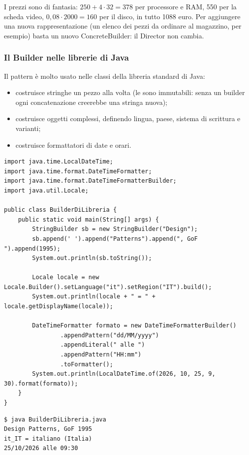 \medskip
I prezzi sono di fantasia: $250 + 4 \cdot 32 = 378$ per processore e RAM, 550 per la scheda video,
$0{,}08 \cdot 2000 = 160$ per il disco, in tutto 1088 euro. Per aggiungere una nuova rappresentazione (un elenco dei pezzi
da ordinare al magazzino, per esempio) basta un nuovo ConcreteBuilder: il Director non cambia.

\subsubsection*{Il Builder nelle librerie di Java}

Il pattern è molto usato nelle classi della libreria standard di Java:
\begin{itemize}
  \item {} costruisce stringhe un pezzo alla volta (le  sono immutabili: senza un
        builder ogni concatenazione creerebbe una stringa nuova);
  \item {} costruisce oggetti  complessi, definendo lingua, paese, sistema di
        scrittura e varianti;
  \item {} costruisce formattatori di date e orari.
\end{itemize}

\begin{lstlisting}[style=java, name=BuilderDiLibreria.java]
import java.time.LocalDateTime;
import java.time.format.DateTimeFormatter;
import java.time.format.DateTimeFormatterBuilder;
import java.util.Locale;

public class BuilderDiLibreria {
    public static void main(String[] args) {
        StringBuilder sb = new StringBuilder("Design");
        sb.append(' ').append("Patterns").append(", GoF ").append(1995);
        System.out.println(sb.toString());

        Locale locale = new Locale.Builder().setLanguage("it").setRegion("IT").build();
        System.out.println(locale + " = " + locale.getDisplayName(locale));

        DateTimeFormatter formato = new DateTimeFormatterBuilder()
                .appendPattern("dd/MM/yyyy")
                .appendLiteral(" alle ")
                .appendPattern("HH:mm")
                .toFormatter();
        System.out.println(LocalDateTime.of(2026, 10, 25, 9, 30).format(formato));
    }
}
\end{lstlisting}
\begin{lstlisting}[style=shell, name=Terminale]
$ java BuilderDiLibreria.java
Design Patterns, GoF 1995
it_IT = italiano (Italia)
25/10/2026 alle 09:30
\end{lstlisting}

